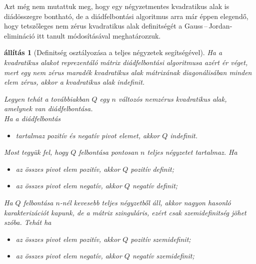 \documentclass[a4paper, showtrims]{memoir}
\theoremstyle{plain}
\newtheorem{proposition}{állítás}[chapter]
\theoremstyle{remark}
\theoremstyle{definition}
\begin{document}
Azt még nem mutattuk meg, hogy egy négyzetmentes kvadratikus alak is diádösszegre bontható,
de a diádfelbontási algoritmus arra már éppen elegendő, hogy
tetszőleges nem zérus kvadratikus alak definitségét a Gauss\,--\,Jordan-elimináció itt tanult módosításával
meghatározzuk.

\begin{proposition}[Definitség osztályozása a teljes négyzetek segítségével]\label{ap:quad-summary}
Ha a kvadratikus alakot reprezentáló mátrix diádfelbontási algoritmusa azért ér véget,
mert egy nem zérus maradék kvadratikus alak mátrixának diagonálisában minden elem zérus,
akkor a kvadratikus alak indefinit.

Legyen tehát a továbbiakban $Q$ egy $n$ változós nemzérus kvadratikus alak, amelynek van diádfelbontása.\\
Ha a diádfelbontás
\begin{itemize}
    \item tartalmaz pozitív és negatív pivot elemet, 
        akkor $Q$ \emph{indefinit}.
\end{itemize}
Most tegyük fel, hogy $Q$ felbontása pontosan $n$ teljes négyzetet tartalmaz.
Ha
\begin{itemize}
    \item az összes pivot elem pozitív,
        akkor $Q$ \emph{pozitív definit};
    \item az összes pivot elem negatív,
        akkor $Q$ \emph{negatív definit};
\end{itemize}
Ha $Q$ felbontása $n$-nél kevesebb teljes négyzetből áll,
akkor nagyon hasonló karakterizációt kapunk, de a mátrix szinguláris, ezért csak szemidefinitség jöhet szóba.
Tehát ha
\begin{itemize}
\item az összes pivot elem pozitív,
    akkor $Q$ \emph{pozitív szemidefinit};
\item az összes pivot elem negatív,
    akkor $Q$ \emph{negatív szemidefinit};\qedhere
\end{itemize}
\end{proposition}
\end{document}

